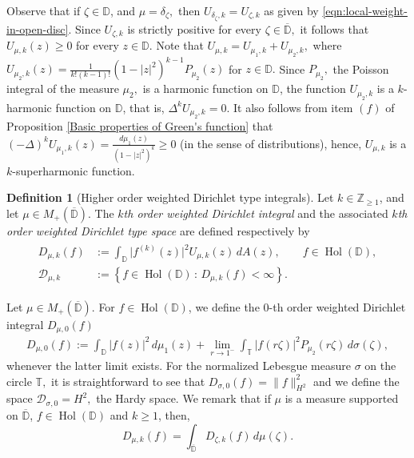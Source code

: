 \documentclass[10pt,oneside,reqno]{amsart}
\theoremstyle{definition}
\newtheorem{definition}[theorem]{Definition}
\theoremstyle{remark}
\renewcommand{\ge}{\geqslant}
\newcommand{\D}{\mathbb D}
\newcommand{\T}{\mathbb T}
\numberwithin{equation}{section}
\begin{document}
Observe that if $\zeta \in \D$, and $\mu=\delta_{\zeta},$  then  $U_{\delta_{\zeta}, k} =U_{\zeta, k}$ as given by \eqref{eqn:local-weight-in-open-disc}. Since $U_{\zeta, k}$ is strictly positive for every $\zeta\in \overline{\D},$ it follows that $U_{\mu, k}(z)\geqslant 0$ for every $z\in \D.$ Note that $U_{\mu,k}= U_{\mu_{1},k} +U_{\mu_2,k},$ where $U_{\mu_2,k}(z)=\frac{1}{k!(k-1)!} (1-|z|^2)^{k-1} P_{\mu_2}(z)$ for $z\in \D.$  Since $P_{\mu_2},$ the Poisson integral of the measure $\mu_2,$ is a harmonic function on $\mathbb D$, the function $U_{\mu_2,k}$ is a $k$-harmonic function on $\D$, that is, $\Delta ^{k} U_{\mu_2, k}= 0.$ It also follows from item $(f)$ of Proposition \ref{Basic properties of Green's function} that $ \left ( -\Delta \right )^{k} U_{\mu_{1}, k}(z) = \frac{d\mu_1(z)}{(1-|z|^2)^k} \geqslant 0$ (in the sense of distributions), hence, $U_{\mu,k}$ is a $k$-superharmonic function. 

\begin{definition}[Higher order weighted Dirichlet type integrals]
Let $k \in \mathbb Z_{\ge 1}$, and let $\mu\in M_+(\overline{\D}).$ The \textit{$k$th order weighted Dirichlet integral} and the associated \textit{$k$th order weighted Dirichlet type space} are defined respectively by
\begin{align*}
\begin{split}
D_{\mu, k} (f) &:= \int_{\D} \lvert f^{(k)} (z) \rvert^2 U_{\mu, k} (z) \, dA(z), \qquad f \in \operatorname{Hol} (\D), \\
\mathscr D_{\mu, k} &:= \left \{ f \in \operatorname{Hol} (\D) \, : \, D_{\mu, k} (f) < \infty \right \}.
\end{split}
\end{align*}
\end{definition}
Let $\mu\in M_+(\overline{\D}).$ For $f\in \operatorname{Hol} (\D)$, we define the $0$-th order weighted Dirichlet integral $D_{\mu,0}(f)$  
\begin{align*}
    D_{\mu,0}(f) := \int_{\mathbb D} |f(z)|^2 \, d\mu_1(z) + \lim\limits_{r \to 1^{-}}
        \int_{\mathbb T} |f(r\zeta)|^2 P_{\mu_2}(r\zeta) \,d\sigma(\zeta),
\end{align*}
whenever the latter limit exists. For the normalized  Lebesgue measure $\sigma$ on the circle $\T,$ it is straightforward to see that $D_{\sigma,0}(f)= \|f\|_{H^2}^2$ and we define the space $\mathscr D_{\sigma,0}= H^2,$ the Hardy space.  We remark that if $\mu$ is a measure supported on $\overline{\D}$, $f\in \operatorname{Hol} (\D)$ and $k \ge 1$, then, 
\begin{equation} \label{eqn:local-dirichlet-integral}
    D_{\mu, k} (f) = \int_{\overline{\D}} D_{\zeta, k} (f) \, d\mu (\zeta).
\end{equation}
\end{document}

